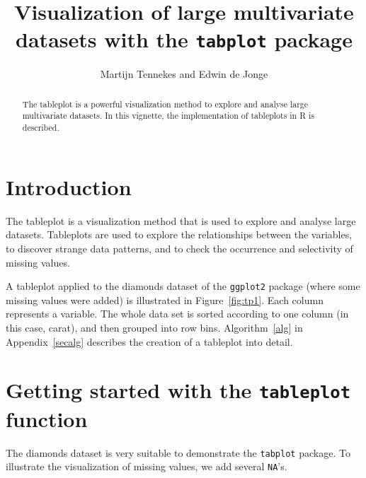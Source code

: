 \documentclass[11pt, fleqn, a4paper]{article}
\title{Visualization of large multivariate datasets with the {\tt tabplot} package}
\author{Martijn Tennekes and Edwin de Jonge}
\begin{document}

\maketitle
\begin{abstract}

The tableplot is a powerful visualization method to explore and analyse large multivariate datasets. In this vignette, the implementation of tableplots in R is described. 


\end{abstract}

\maketitle


\section{Introduction}
The tableplot is a visualization method that is used to explore and analyse large datasets. Tableplots are used to explore the relationships between the variables, to discover strange data patterns, and to check the occurrence and selectivity of missing values. 

A tableplot applied to the diamonds dataset of the {\tt ggplot2} package (where some missing values were added) is illustrated in Figure~\ref{fig:tp1}. Each column represents a variable. The whole data set is sorted according to one column (in this case, carat), and then grouped into row bins. Algorithm~\ref{alg} in Appendix~\ref{secalg} describes the creation of a tableplot into detail.

\section{Getting started with the {\tt tableplot} function}

The diamonds dataset is very suitable to demonstrate the {\tt tabplot} package. To illustrate the visualization of missing values, we add several {\tt NA}'s.

\begin{Schunk}
\end{Schunk}
\end{document}
